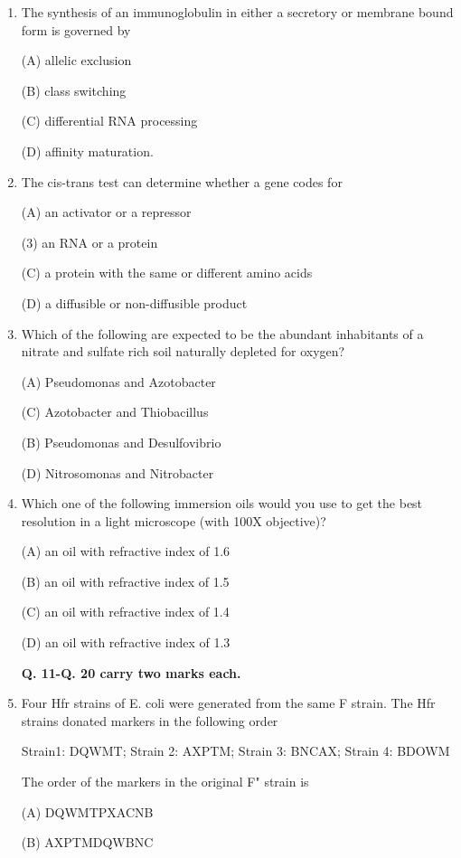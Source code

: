\documentclass[journal]{IEEEtran}
\begin{document}
\begin{enumerate}
{(C) Interferon gamma

(B) Tamiflu

(D) Neutralizing antibody
}
\item {The synthesis of an immunoglobulin in either a secretory or membrane bound form is governed by

(A) allelic exclusion

(B) class switching

(C) differential RNA processing

(D) affinity maturation.
}
\item {The cis-trans test can determine whether a gene codes for

(A) an activator or a repressor

(3) an RNA or a protein

(C) a protein with the same or different amino acids

(D) a diffusible or non-diffusible product
}
\item {Which of the following are expected to be the abundant inhabitants of a nitrate and sulfate rich soil naturally depleted for oxygen?

(A) Pseudomonas and Azotobacter

(C) Azotobacter and Thiobacillus

(B) Pseudomonas and Desulfovibrio

(D) Nitrosomonas and Nitrobacter
}
\item{ Which one of the following immersion oils would you use to get the best resolution in a light microscope (with 100X objective)?

(A) an oil with refractive index of 1.6

(B) an oil with refractive index of 1.5

(C) an oil with refractive index of 1.4

(D) an oil with refractive index of 1.3
}
\begin{center}
\textbf{Q. 11-Q. 20 carry two marks each.}
\end{center}
\item {Four Hfr strains of E. coli were generated from the same F strain. The Hfr strains donated markers in the following order

Strain1: DQWMT; Strain 2: AXPTM; Strain 3: BNCAX; Strain 4: BDOWM

The order of the markers in the original F" strain is

(A) DQWMTPXACNB

(B) AXPTMDQWBNC

}
\end{enumerate}
\end{document}
